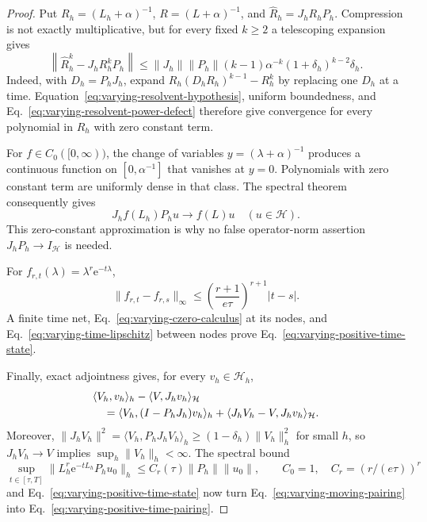 \documentclass[aps,physrev,onecolumn,amsmath,amssymb,longbibliography]{revtex4-2}
\newcommand{\e}{\mathrm e}
\begin{document}
\begin{proof}
Put \(R_h=(L_h+\alpha)^{-1}\), \(R=(L+\alpha)^{-1}\), and
\(\widehat R_h=J_hR_hP_h\).  Compression is not exactly multiplicative, but
for every fixed \(k\ge2\) a telescoping expansion gives
\begin{equation}
 \left\|\widehat R_h^k-J_hR_h^kP_h\right\|
 \le \|J_h\|\|P_h\|(k-1)\alpha^{-k}
      (1+\delta_h)^{k-2}\delta_h.
 \label{eq:varying-resolvent-power-defect}
\end{equation}
Indeed, with \(D_h=P_hJ_h\), expand
\(R_h(D_hR_h)^{k-1}-R_h^k\) by replacing one \(D_h\) at a time.
Equation~\eqref{eq:varying-resolvent-hypothesis}, uniform boundedness, and
Eq.~\eqref{eq:varying-resolvent-power-defect} therefore give convergence for
every polynomial in \(R_h\) with zero constant term.

For \(f\in C_0([0,\infty))\), the change of variables
\(y=(\lambda+\alpha)^{-1}\) produces a continuous function on
\([0,\alpha^{-1}]\) that vanishes at \(y=0\).  Polynomials with zero constant
term are uniformly dense in that class.  The spectral theorem consequently
gives
\begin{equation}
 J_hf(L_h)P_hu\longrightarrow f(L)u
 \quad (u\in\mathcal H).
 \label{eq:varying-czero-calculus}
\end{equation}
This zero-constant approximation is why no false operator-norm assertion
\(J_hP_h\to I_{\mathcal H}\) is needed.

For \(f_{r,t}(\lambda)=\lambda^r\e^{-t\lambda}\),
\begin{equation}
 \|f_{r,t}-f_{r,s}\|_\infty
 \le
 \left(\frac{r+1}{e\tau}\right)^{r+1}|t-s|.
 \label{eq:varying-time-lipschitz}
\end{equation}
A finite time net, Eq.~\eqref{eq:varying-czero-calculus} at its nodes, and
Eq.~\eqref{eq:varying-time-lipschitz} between nodes prove
Eq.~\eqref{eq:varying-positive-time-state}.

Finally, exact adjointness gives, for every \(v_h\in\mathcal H_h\),
\begin{align}
 &\langle V_h,v_h\rangle_h-\langle V,J_hv_h\rangle_{\mathcal H}
 \notag\\
 &\quad=\langle V_h,(I-P_hJ_h)v_h\rangle_h
 +\langle J_hV_h-V,J_hv_h\rangle_{\mathcal H}.
 \label{eq:varying-moving-pairing}
\end{align}
Moreover,
\(\|J_hV_h\|^2=\langle V_h,P_hJ_hV_h\rangle_h
\ge(1-\delta_h)\|V_h\|_h^2\) for small \(h\), so
\(J_hV_h\to V\) implies \(\sup_h\|V_h\|_h<\infty\).  The spectral bound
\begin{equation}
 \sup_{t\in[\tau,T]}\|L_h^r\e^{-tL_h}P_hu_0\|_h
 \le C_r(\tau)\|P_h\|\|u_0\|,
 \qquad
 C_0=1,\quad C_r=(r/(e\tau))^r
 \label{eq:varying-discrete-spectral-bound}
\end{equation}
and Eq.~\eqref{eq:varying-positive-time-state} now turn
Eq.~\eqref{eq:varying-moving-pairing} into
Eq.~\eqref{eq:varying-positive-time-pairing}.
\end{proof}
\end{document}
